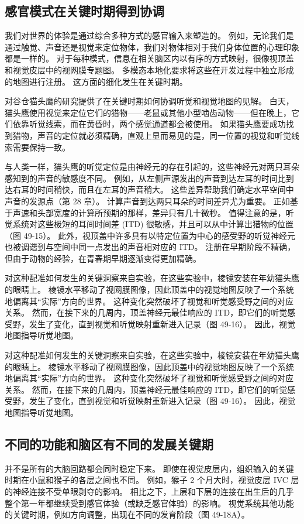 \subsection{感官模式在关键时期得到协调}
我们对世界的体验是通过综合多种方式的感官输入来塑造的。 例如，无论我们是通过触觉、声音还是视觉来定位物体，我们对物体相对于我们身体位置的心理印象都是一样的。 对于每种模式，信息在相关脑区内以有序的方式映射，很像视顶盖和视觉皮层中的视网膜专题图。 多模态本地化要求将这些在开发过程中独立形成的地图进行注册。 这方面的细化发生在关键时期。

对谷仓猫头鹰的研究提供了在关键时期如何协调听觉和视觉地图的见解。 白天，猫头鹰使用视觉来定位它们的猎物——老鼠或其他小型啮齿动物——但在晚上，它们依靠听觉线索，而在黄昏时，两个感觉通道都会被使用。 如果猫头鹰要成功找到猎物，声音的定位就必须精确，直观上显而易见的是，同一位置的视觉和听觉线索需要保持一致。

与人类一样，猫头鹰的听觉定位是由神经元的存在引起的，这些神经元对两只耳朵感知到的声音的敏感度不同。 例如，从左侧声源发出的声音到达左耳的时间比到达右耳的时间稍快，而且在左耳的声音稍大。 这些差异帮助我们确定水平空间中声音的发源点（第 28 章）。 计算声音到达两只耳朵的时间差异尤为重要。 正如基于声速和头部宽度的计算所预期的那样，差异只有几十微秒。 值得注意的是，听觉系统对这些极短的耳间时间差 (ITD) 很敏感，并且可以从中计算出猎物的位置（图 49-15）。 此外，视顶盖中许多具有以特定位置为中心的感受野的听觉神经元也被调谐到与空间中同一点发出的声音相对应的 ITD。 注册在早期阶段不精确，但由于动物的经验，在青春期早期逐渐变得更加精确。

对这种配准如何发生的关键洞察来自实验，在这些实验中，棱镜安装在年幼猫头鹰的眼睛上。 棱镜水平移动了视网膜图像，因此顶盖中的视觉地图反映了一个系统地偏离其“实际”方向的世界。 这种变化突然破坏了视觉和听觉感受野之间的对应关系。 然而，在接下来的几周内，顶盖神经元最佳响应的 ITD，即它们的听觉感受野，发生了变化，直到视觉和听觉映射重新进入记录（图 49-16）。 因此，视觉地图指导听觉地图。

对这种配准如何发生的关键洞察来自实验，在这些实验中，棱镜安装在年幼猫头鹰的眼睛上。 棱镜水平移动了视网膜图像，因此顶盖中的视觉地图反映了一个系统地偏离其“实际”方向的世界。 这种变化突然破坏了视觉和听觉感受野之间的对应关系。 然而，在接下来的几周内，顶盖神经元最佳响应的 ITD，即它们的听觉感受野，发生了变化，直到视觉和听觉映射重新进入记录（图 49-16）。 因此，视觉地图指导听觉地图。

\subsection{不同的功能和脑区有不同的发展关键期}
并不是所有的大脑回路都会同时稳定下来。 即使在视觉皮层内，组织输入的关键时期在小鼠和猴子的各层之间也不同。 例如，猴子 2 个月大时，视觉皮层 IVC 层的神经连接不受单眼剥夺的影响。 相比之下，上层和下层的连接在出生后的几乎整个第一年都继续受到感官体验（或缺乏感官体验）的影响。 视觉系统其他功能的关键时期，例如方向调整，出现在不同的发育阶段（图 49-18A）。

